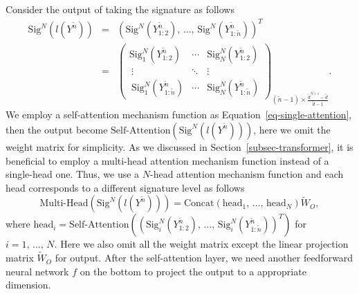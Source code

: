 \documentclass[]{article}
\renewcommand{\(}{\left(}
\renewcommand{\)}{\right)}
\begin{document}
	Consider the output of taking the signature as follows
	\begin{eqnarray}
		\label{eq-signature-output}
		\text{Sig}^N(l(Y^{\widetilde{n}}))
		&=&{(\text{Sig}^N(Y^{\widetilde{n}}_{1:2}),\,\ldots,\,\text{Sig}^N(Y^{\widetilde{n}}_{1:\widetilde{n}}))}^T \nonumber\\
		&=&
		{\begin{pmatrix}
				\text{Sig}_1^N(Y^{\widetilde{n}}_{1:2})&\cdots&\text{Sig}_N^N(Y^{\widetilde{n}}_{1:2}) \\\
				\vdots&\ddots&\vdots \\\
				\text{Sig}_1^N(Y^{\widetilde{n}}_{1:\widetilde{n}})&\cdots&\text{Sig}_N^N(Y^{\widetilde{n}}_{1:\widetilde{n}}) 
		\end{pmatrix}}_{(\widetilde{n}-1)\times\frac{\widetilde{d}^{N+1}-\widetilde{d}}{\widetilde{d}-1}}.
	\end{eqnarray}
	We employ a self-attention mechanism function as Equation~\eqref{eq-single-attention}, then the output become $\text{Self-Attention}(\text{Sig}^N(l(Y^{\widetilde{n}})))$, here we omit the weight matrix for simplicity. As we discussed in Section~\ref{subsec-transformer}, it is beneficial to employ a multi-head attention mechanism function instead of a single-head one. Thus, we use a $N$-head attention mechanism function and each head corresponds to a different signature level as follows
	\begin{equation}
		\text{Multi-Head}(\text{Sig}^N(l(Y^{\widetilde{n}})))=\text{Concat}(\text{head}_1,\,\ldots,\,\text{head}_N)\widetilde{W}_O,
	\end{equation}
	where $\text{head}_i=\text{Self-Attention}({(\text{Sig}_i^N(Y_{1:2}^{\widetilde{n}}),\,\ldots,\,\text{Sig}_i^N(Y_{1:\widetilde{n}}^{\widetilde{n}}))}^T)$ for $i=1,\,\ldots,\,N$. Here we also omit all the weight matrix except the linear projection matrix $\widetilde{W}_O$ for output. After the self-attention layer, we need another feedforward neural network $f$ on the bottom to project the output to a appropriate dimension.
	
\end{document}
